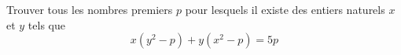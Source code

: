 Trouver tous les nombres premiers $p$ pour lesquels il existe des entiers naturels $x$ et $y$ tels que
$$x(y^2 - p) + y(x^2 - p) = 5p$$